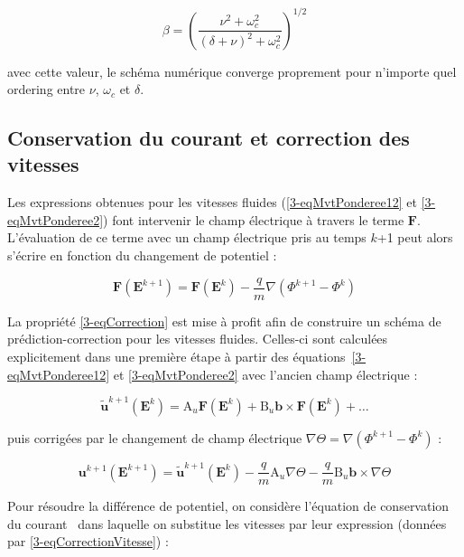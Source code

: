 \begin{refsection}
\begin{equation}
\label{3-eqMvtPonderee3}
\beta=\left(\frac{\nu^2+\omega_c^2}{(\delta+\nu)^2+\omega_c^2}\right)^{1/2}
\end{equation}

avec cette valeur, le schéma numérique converge proprement pour n'importe quel
ordering entre $\nu$, $\omega_c$ et $\delta$.


\subsection{Conservation du courant et correction des vitesses}

Les expressions obtenues pour les vitesses
fluides (\eqref{3-eqMvtPonderee12} et \eqref{3-eqMvtPonderee2}) font intervenir
le champ électrique à travers le terme $\mathbf F$.
L'évaluation de ce terme avec un champ électrique pris au temps $k$+1 peut alors
s'écrire en fonction du changement de potentiel :

\begin{equation}
\label{3-eqCorrection}
\mathbf F(\mathbf E^{k+1}) = \mathbf F(\mathbf E^{k})-\frac{q}{m}\nabla
(\Phi^{k+1}-\Phi^{k})
\end{equation}

La propriété \eqref{3-eqCorrection} est mise à profit afin de construire un
schéma de prédiction-correction pour les vitesses fluides. Celles-ci sont
calculées explicitement dans une première étape à partir des
équations~\eqref{3-eqMvtPonderee12} et \eqref{3-eqMvtPonderee2} avec 
l'ancien champ électrique :

\begin{equation}
\tilde{\mathbf u}^{k+1}(\mathbf{E}^k)=\text{A}_u\mathbf F(\mathbf E^{k}) +
\text{B}_u\mathbf b\times\mathbf F(\mathbf E^{k}) + \text{\ldots}
\end{equation}

puis corrigées par le changement de champ électrique
$\nabla\Theta=\nabla(\Phi^{k+1}-\Phi^k)$ :

\begin{equation}
\label{3-eqCorrectionVitesse}
\mathbf u^{k+1}(\mathbf{E}^{k+1}) = \tilde{\mathbf
u}^{k+1}(\mathbf{E}^k)-\frac{q}{m}\text{A}_u\nabla
\Theta-\frac{q}{m}\text{B}_u\mathbf b\times\nabla
\Theta
\end{equation}

Pour résoudre la différence de potentiel, on considère l'équation de
conservation du courant~ dans laquelle on substitue les
vitesses par leur expression (données par \eqref{3-eqCorrectionVitesse}) :


\end{refsection}

